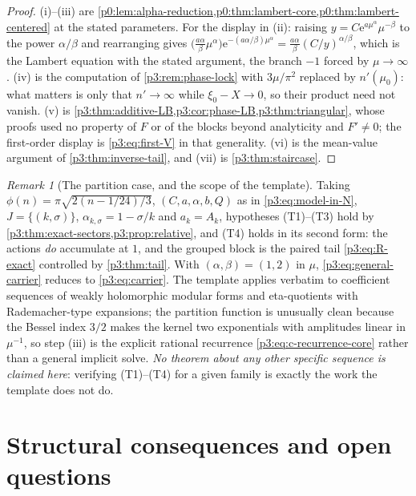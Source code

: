 \documentclass[11pt,a4paper,oneside]{book}
\theoremstyle{plain}
\theoremstyle{definition}
\theoremstyle{remark}
\newtheorem{remark}[theorem]{Remark}
\newcommand{\e}{\mathrm{e}}
\begin{document}
\begin{proof}
(i)--(iii) are \cref{p0:lem:alpha-reduction,p0:thm:lambert-core,p0:thm:lambert-centered} at the
stated parameters. For the display in (ii): raising $y=C\e^{a\mu^{\alpha}}\mu^{-\beta}$ to the
power $\alpha/\beta$ and rearranging gives $\bigl(\tfrac{a\alpha}{\beta}\mu^{\alpha}\bigr)
\e^{-(a\alpha/\beta)\mu^{\alpha}}=\tfrac{a\alpha}{\beta}(C/y)^{\alpha/\beta}$, which is the
Lambert equation with the stated argument, the branch $-1$ forced by $\mu\to\infty$. (iv) is the
computation of \cref{p3:rem:phase-lock} with $3\mu/\pi^{2}$ replaced by $n'(\mu_{0})$: what
matters is only that $n'\to\infty$ while $\xi_{0}-X\to0$, so their product need not vanish. (v) is
\cref{p3:thm:additive-LB,p3:cor:phase-LB,p3:thm:triangular}, whose proofs used no property of $F$
or of the blocks beyond analyticity and $F'\ne0$; the first-order display is \cref{p3:eq:first-V}
in that generality. (vi) is the mean-value argument of \cref{p3:thm:inverse-tail}, and (vii) is
\cref{p3:thm:staircase}.
\end{proof}

\begin{remark}[The partition case, and the scope of the template]
\label{p3:rem:template-scope}
Taking $\phi(n)=\pi\sqrt{2(n-1/24)/3}$, $(C,a,\alpha,b,Q)$ as in \cref{p3:eq:model-in-N},
$J=\{(k,\sigma)\}$, $\alpha_{k,\sigma}=1-\sigma/k$ and $a_{k}=A_{k}$, hypotheses (T1)--(T3) hold
by \cref{p3:thm:exact-sectors,p3:prop:relative}, and (T4) holds in its second form: the actions
\emph{do} accumulate at $1$, and the grouped block is the paired tail \cref{p3:eq:R-exact}
controlled by \cref{p3:thm:tail}. With $(\alpha,\beta)=(1,2)$ in $\mu$,
\cref{p3:eq:general-carrier} reduces to \cref{p3:eq:carrier}. The template applies verbatim to
coefficient sequences of weakly holomorphic modular forms and eta-quotients with Rademacher-type
expansions; the partition function is unusually clean because the Bessel index $3/2$ makes the
kernel two exponentials with amplitudes linear in $\mu^{-1}$, so step (iii) is the explicit
rational recurrence \cref{p3:eq:c-recurrence-core} rather than a general implicit solve. \emph{No
theorem about any other specific sequence is claimed here}: verifying (T1)--(T4) for a given
family is exactly the work the template does not do.
\end{remark}

\section{Structural consequences and open questions}\label{p3:sec:open}
\end{document}
